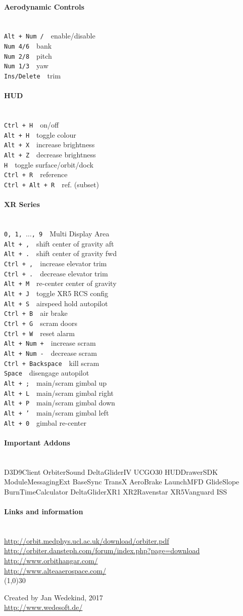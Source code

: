 \documentclass[11pt]{scrartcl} %
\newcommand{\command}[2]{\texttt{#1}~\dotfill{}~#2\\} %
\newcommand{\sectiontitle}[1]{\paragraph{#1} \ \\} %
\newcommand{\sep}{\hspace{5mm}}
\begin{document}
\sep
\begin{minipage}[t]{64mm}
\sectiontitle{Aerodynamic Controls}
\command{Alt + Num /}{enable/disable}
\command{Num 4/6}{bank}
\command{Num 2/8}{pitch}
\command{Num 1/3}{yaw}
\command{Ins/Delete}{trim}

\sectiontitle{HUD}
\command{Ctrl + H}{on/off}
\command{Alt + H}{toggle colour}
\command{Alt + X}{increase brightness}
\command{Alt + Z}{decrease brightness}
\command{H}{toggle surface/orbit/dock}
\command{Ctrl + R}{reference}
\command{Ctrl + Alt + R}{ref. (subset)}

\sectiontitle{XR Series}
\command{0, 1, $\ldots$, 9}{Multi Display Area}
\command{Alt + ,}{shift center of gravity aft}
\command{Alt + .}{shift center of gravity fwd}
\command{Ctrl + ,}{increase elevator trim}
\command{Ctrl + .}{decrease elevator trim}
\command{Alt + M}{re-center center of gravity}
\command{Alt + J}{toggle XR5 RCS config}
\command{Alt + S}{airspeed hold autopilot}
\command{Ctrl + B}{air brake}
\command{Ctrl + G}{scram doors}
\command{Ctrl + W}{reset alarm}
\command{Alt + Num +}{increase scram}
\command{Alt + Num -}{decrease scram}
\command{Ctrl + Backspace}{kill scram}
\command{Space}{disengage autopilot}
\command{Alt + ;}{main/scram gimbal up}
\command{Alt + L}{main/scram gimbal right}
\command{Alt + P}{main/scram gimbal down}
\command{Alt + '}{main/scram gimbal left}
\command{Alt + 0}{gimbal re-center}
\end{minipage}
\sep
\begin{minipage}[t]{64mm}
\sectiontitle{Important Addons}
D3D9Client
OrbiterSound
DeltaGliderIV
UCGO30
HUDDrawerSDK
ModuleMessagingExt
BaseSync
TransX
AeroBrake
LaunchMFD
GlideSlope
BurnTimeCalculator
DeltaGliderXR1
XR2Ravenstar
XR5Vanguard
ISS\\

\vspace{\baselineskip}
\sectiontitle{Links and information}
\url{http://orbit.medphys.ucl.ac.uk/download/orbiter.pdf}\medskip\\
\url{http://orbiter.dansteph.com/forum/index.php?page=download}\medskip\\
\url{http://www.orbithangar.com/}\medskip\\
\url{http://www.alteaaerospace.com/}\medskip\\

\linethickness{0.5mm} %
{\color{mygray}\line(1,0){30}} %

\footnotesize{
Created by Jan Wedekind, 2017\\
\url{http://www.wedesoft.de/}\\
}

\end{minipage} %
\end{document}
